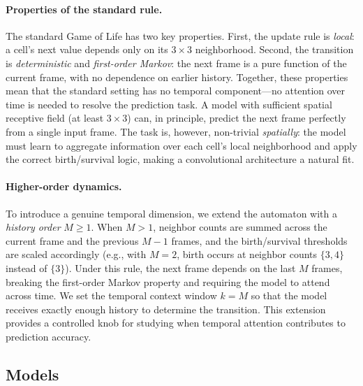 \paragraph{Properties of the standard rule.}
The standard Game of Life has two key properties.
First, the update rule is \emph{local}: a cell's next value depends only on its $3 \times 3$ neighborhood.
Second, the transition is \emph{deterministic} and \emph{first-order Markov}: the next frame is a pure function of the current frame, with no dependence on earlier history.
Together, these properties mean that the standard setting has no temporal component---no attention over time is needed to resolve the prediction task. A model with sufficient spatial receptive field (at least $3 \times 3$) can, in principle, predict the next frame perfectly from a single input frame.
The task is, however, non-trivial \emph{spatially}: the model must learn to aggregate information over each cell's local neighborhood and apply the correct birth/survival logic, making a convolutional architecture a natural fit.

\paragraph{Higher-order dynamics.}
To introduce a genuine temporal dimension, we extend the automaton with a \emph{history order} $M \geq 1$.
When $M > 1$, neighbor counts are summed across the current frame and the previous $M - 1$ frames, and the birth/survival thresholds are scaled accordingly (e.g., with $M = 2$, birth occurs at neighbor counts $\{3, 4\}$ instead of $\{3\}$).
Under this rule, the next frame depends on the last $M$ frames, breaking the first-order Markov property and requiring the model to attend across time.
We set the temporal context window $k = M$ so that the model receives exactly enough history to determine the transition.
This extension provides a controlled knob for studying when temporal attention contributes to prediction accuracy.
\subsection{Models}

